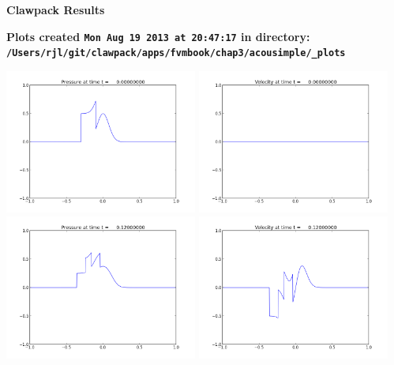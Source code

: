 \documentclass[11pt]{article}
\begin{document}
        \begin{center}{\Large\bf Clawpack Results}\vskip 5pt
        
        \bf Plots created {\tt Mon Aug 19 2013 at 20:47:17} in directory: \vskip 5pt
        \verb+/Users/rjl/git/clawpack/apps/fvmbook/chap3/acousimple/_plots+
        \end{center}
        \vskip 5pt
        \includegraphics[width=0.475\textwidth]{frame0000fig1.png}
\includegraphics[width=0.475\textwidth]{frame0000fig2.png}
\vskip 10pt 
\includegraphics[width=0.475\textwidth]{frame0001fig1.png}
\includegraphics[width=0.475\textwidth]{frame0001fig2.png}
\vskip 10pt 
\end{document}
